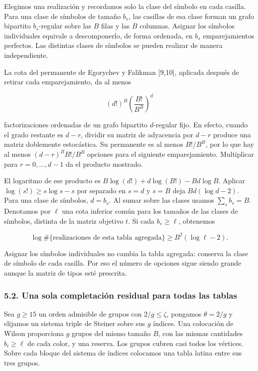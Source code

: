\documentclass[spanish,11pt,a4paper]{article}
\begin{document}
Elegimos una realización y recordamos solo la clase del símbolo en cada casilla. Para una clase de símbolos de tamaño \(b_s\), las casillas de esa clase forman un grafo bipartito \(b_s\)-regular sobre las \(B\) filas y las \(B\) columnas. Asignar los símbolos individuales equivale a descomponerlo, de forma ordenada, en \(b_s\) emparejamientos perfectos. Las distintas clases de símbolos se pueden realizar de manera independiente.

La cota del permanente de Egorychev y Falikman {[}9,10{]}, aplicada después de retirar cada emparejamiento, da al menos

\[(d!)^B\left(\frac{B!}{B^B}\right)^d\]

factorizaciones ordenadas de un grafo bipartito \(d\)-regular fijo. En efecto, cuando el grado restante es \(d-r\), dividir su matriz de adyacencia por \(d-r\) produce una matriz doblemente estocástica. Su permanente es al menos \(B!/B^B\), por lo que hay al menos \((d-r)^B B!/B^B\) opciones para el siguiente emparejamiento. Multiplicar para \(r=0,\ldots,d-1\) da el producto mostrado.

El logaritmo de ese producto es \(B\log(d!)+d\log(B!)-Bd\log B\). Aplicar \(\log(s!)\ge s\log s-s\) por separado en \(s=d\) y \(s=B\) deja \(Bd(\log d-2)\). Para una clase de símbolos, \(d=b_s\). Al sumar sobre las clases usamos \(\sum_s b_s=B\). Denotamos por \(\ell\) una cota inferior común para los tamaños de las clases de símbolos, distinta de la matriz objetivo \(t\). Si cada \(b_s\ge\ell\), obtenemos

\[\log\#\{\text{realizaciones de esta tabla agregada}\}
\ge B^2(\log\ell-2).\tag{5.1}\]

Asignar los símbolos individuales no cambia la tabla agregada: conserva la clase de símbolo de cada casilla. Por eso el número de opciones sigue siendo grande aunque la matriz de tipos esté prescrita.

\subsubsection{5.2. Una sola completación residual para todas las tablas}\label{una-sola-completaciuxf3n-residual-para-todas-las-tablas}

Sea \(g\ge15\) un orden admisible de grupos con \(2/g\le\zeta\), pongamos \(\theta=2/g\) y elijamos un sistema triple de Steiner sobre sus \(g\) índices. Una colocación de Wilson proporciona \(g\) grupos del mismo tamaño \(B\), con las mismas cantidades \(b_i\ge\ell\) de cada color, y una reserva. Los grupos cubren casi todos los vértices. Sobre cada bloque del sistema de índices colocamos una tabla latina entre sus tres grupos.
\end{document}
